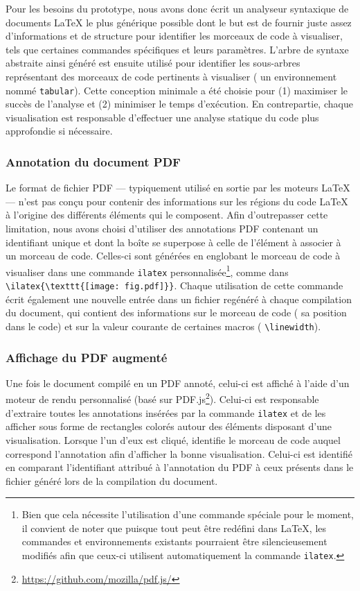 Pour les besoins du prototype, nous avons donc écrit un analyseur syntaxique de documents \LaTeX{} le plus générique possible dont le but est de fournir juste assez d'informations et de structure pour identifier les morceaux de code à visualiser, tels que certaines commandes spécifiques et leurs paramètres.
L'arbre de syntaxe abstraite ainsi généré est ensuite utilisé pour identifier les sous-arbres représentant des morceaux de code pertinents à visualiser (\eg{} un environnement nommé \texttt{tabular}).
Cette conception minimale a été choisie pour (1) maximiser le succès de l'analyse et (2) minimiser le temps d'exécution.
En contrepartie, chaque visualisation est responsable d'effectuer une analyse statique du code plus approfondie si nécessaire.


\subsubsection{Annotation du document PDF}
Le format de fichier PDF --- typiquement utilisé en sortie par les moteurs \LaTeX{} --- n'est pas conçu pour contenir des informations sur les régions du code \LaTeX{} à l'origine des différents éléments qui le composent.
Afin d'outrepasser cette limitation, nous avons choisi d'utiliser des annotations PDF contenant un identifiant unique et dont la boîte se superpose à celle de l'élément à associer à un morceau de code.
Celles-ci sont générées en englobant le morceau de code à visualiser dans une commande \texttt{ilatex} personnalisée\footnote{Bien que cela nécessite l'utilisation d'une commande spéciale pour le moment, il convient de noter que puisque tout peut être redéfini dans \LaTeX{}, les commandes et environnements existants pourraient être silencieusement modifiés afin que ceux-ci utilisent automatiquement la commande \texttt{ilatex}.}, comme dans \verb|\ilatex{\texttt{[image: fig.pdf]}}|.
Chaque utilisation de cette commande écrit également une nouvelle entrée dans un fichier regénéré à chaque compilation du document, qui contient des informations sur le morceau de code (\eg{} sa position dans le code) et sur la valeur courante de certaines macros (\eg{} \verb|\linewidth|).


\subsubsection{Affichage du PDF augmenté}
Une fois le document compilé en un PDF annoté, celui-ci est affiché à l'aide d'un moteur de rendu personnalisé (basé sur PDF.js\footnote{\url{https://github.com/mozilla/pdf.js/}}).
Celui-ci est responsable d'extraire toutes les annotations insérées par la commande \texttt{ilatex} et de les afficher sous forme de rectangles colorés autour des éléments disposant d'une visualisation.
Lorsque l'un d'eux est cliqué, \iLaTeX{} identifie le morceau de code auquel correspond l'annotation afin d'afficher la bonne visualisation.
Celui-ci est identifié en comparant l'identifiant attribué à l'annotation du PDF à ceux présents dans le fichier généré lors de la compilation du document.



